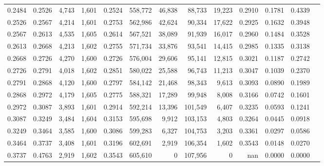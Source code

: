 \begin{tabular}{rrrrrrrrrrrrr}
0.2484 & 0.2526 &  4,743 & 1,601 &                                     0.2524 & 558,772 &  46,838 &  88,733 &  19,223 & 0.2910 & 0.1781 & 0.4339 \\
0.2526 & 0.2567 &  4,214 & 1,601 &                                     0.2753 & 562,986 &  42,624 &  90,334 &  17,622 & 0.2925 & 0.1632 & 0.3948 \\
0.2567 & 0.2613 &  4,535 & 1,605 &                                     0.2614 & 567,521 &  38,089 &  91,939 &  16,017 & 0.2960 & 0.1484 & 0.3528 \\
0.2613 & 0.2668 &  4,213 & 1,602 &                                     0.2755 & 571,734 &  33,876 &  93,541 &  14,415 & 0.2985 & 0.1335 & 0.3138 \\
0.2668 & 0.2726 &  4,270 & 1,600 &                                     0.2726 & 576,004 &  29,606 &  95,141 &  12,815 & 0.3021 & 0.1187 & 0.2742 \\
0.2726 & 0.2791 &  4,018 & 1,602 &                                     0.2851 & 580,022 &  25,588 &  96,743 &  11,213 & 0.3047 & 0.1039 & 0.2370 \\
0.2791 & 0.2868 &  4,120 & 1,600 &                                     0.2797 & 584,142 &  21,468 &  98,343 &   9,613 & 0.3093 & 0.0890 & 0.1989 \\
0.2868 & 0.2972 &  4,179 & 1,605 &                                     0.2775 & 588,321 &  17,289 &  99,948 &   8,008 & 0.3166 & 0.0742 & 0.1601 \\
0.2972 & 0.3087 &  3,893 & 1,601 &                                     0.2914 & 592,214 &  13,396 & 101,549 &   6,407 & 0.3235 & 0.0593 & 0.1241 \\
0.3087 & 0.3249 &  3,484 & 1,604 &                                     0.3153 & 595,698 &   9,912 & 103,153 &   4,803 & 0.3264 & 0.0445 & 0.0918 \\
0.3249 & 0.3464 &  3,585 & 1,600 &                                     0.3086 & 599,283 &   6,327 & 104,753 &   3,203 & 0.3361 & 0.0297 & 0.0586 \\
0.3464 & 0.3737 &  3,408 & 1,601 &                                     0.3196 & 602,691 &   2,919 & 106,354 &   1,602 & 0.3543 & 0.0148 & 0.0270 \\
0.3737 & 0.4763 &  2,919 & 1,602 &                                     0.3543 & 605,610 &       0 & 107,956 &       0 &    nan & 0.0000 & 0.0000 \\
\bottomrule
\end{tabular}
